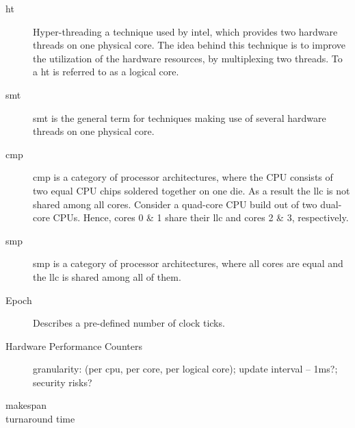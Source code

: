\begin{description}
  \item[\Gls{ht}] Hyper-threading a technique used by \gls{intel}, which provides
    two hardware threads on one physical core.
    The idea behind this technique is to improve the utilization of the
    hardware resources, by multiplexing two threads.
    To a \Gls{ht} is referred to as a logical core.

  \item[\Gls{smt}] \gls{smt} is the general term for techniques making use of
    several hardware threads on one physical core.

  \item[\Gls{cmp}] \gls{cmp} is a category of processor architectures, where
    the CPU consists of two equal CPU chips soldered together on one die.
    As a result the \gls{llc} is not shared among all cores.
    Consider a quad-core CPU build out of two dual-core CPUs.
    Hence, cores 0 \& 1 share their \gls{llc} and cores 2 \& 3, respectively.

  \item[\Gls{smp}] \gls{smp} is a category of processor architectures, where
    all cores are equal and the \gls{llc} is shared among all of them.

  \item[Epoch] Describes a pre-defined number of clock ticks.

  \item[Hardware Performance Counters]  granularity: (per
    cpu, per core, per logical core);
    update interval -- 1ms?;
    security risks?

  \item[makespan]

  \item[turnaround time]



\end{description}
